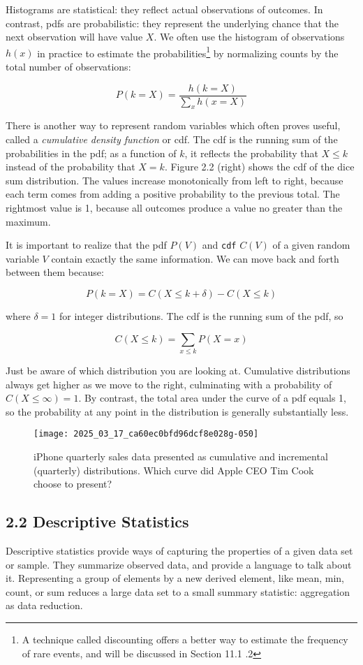 \documentclass[10pt]{article}
\begin{document}
Histograms are statistical: they reflect actual observations of outcomes. In contrast, pdfs are probabilistic: they represent the underlying chance that the next observation will have value \(X\). We often use the histogram of observations \(h(x)\) in practice to estimate the probabilities\footnote{A technique called discounting offers a better way to estimate the frequency of rare events, and will be discussed in Section 11.1 .2} by normalizing counts by the total number of observations:

\[
P(k=X)=\frac{h(k=X)}{\sum_{x} h(x=X)}
\]

There is another way to represent random variables which often proves useful, called a \textit{cumulative density function} or cdf. The cdf is the running sum of the probabilities in the pdf; as a function of \(k\), it reflects the probability that \(X \leq k\) instead of the probability that \(X=k\). Figure 2.2 (right) shows the cdf of the dice sum distribution. The values increase monotonically from left to right, because each term comes from adding a positive probability to the previous total. The rightmost value is 1, because all outcomes produce a value no greater than the maximum.

It is important to realize that the pdf \(P(V)\) and \texttt{cdf} \(C(V)\) of a given random variable \(V\) contain exactly the same information. We can move back and forth between them because:

\[
P(k=X)=C(X \leq k+\delta)-C(X \leq k)
\]

where \(\delta=1\) for integer distributions. The cdf is the running sum of the pdf, so

\[
C(X \leq k)=\sum_{x \leq k} P(X=x)
\]

Just be aware of which distribution you are looking at. Cumulative distributions always get higher as we move to the right, culminating with a probability of \(C(X \leq \infty)=1\). By contrast, the total area under the curve of a pdf equals 1, so the probability at any point in the distribution is generally substantially less.

\begin{figure}[h]
  \centering
  \texttt{[image: 2025\_03\_17\_ca60ec0bfd96dcf8e028g-050]}
  \caption{iPhone quarterly sales data presented as cumulative and incremental (quarterly) distributions. Which curve did Apple CEO Tim Cook choose to present?}
\end{figure}

\subsection*{2.2 Descriptive Statistics}
Descriptive statistics provide ways of capturing the properties of a given data set or sample. They summarize observed data, and provide a language to talk about it. Representing a group of elements by a new derived element, like mean, min, count, or sum reduces a large data set to a small summary statistic: aggregation as data reduction.
\end{document}
